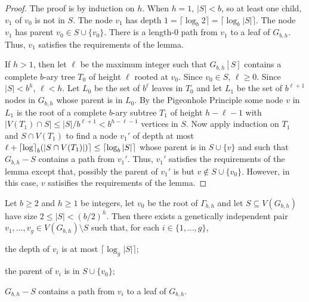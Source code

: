 \documentclass{patmorin}
\begin{document}
\begin{proof}
  The proof is by induction on $h$.  When $h=1$, $|S|< b$, so at least one child, $v_1$ of $v_0$ is not in $S$. The node $v_1$ has depth $1 = \lceil \log_b 2\rceil = \lceil\log_b|S|\rceil$.  The node $v_1$ has parent $v_0\in S\cup\{v_0\}$.  There is a length-$0$ path from $v_1$ to a leaf of $G_{b,h}$. Thus, $v_1$ satisfies the requirements of the lemma.

  If $h>1$, then let $\ell$ be the maximum integer such that $G_{b,h}[S]$ contains a complete $b$-ary tree $T_0$ of height $\ell$ rooted at $v_0$.  Since $v_0\in S$, $\ell\ge 0$.  Since $|S|< b^h$, $\ell < h$. Let $L_0$ be the set of $b^\ell$ leaves in $T_0$ and let $L_1$ be the set of $b^{\ell+1}$ nodes in $G_{b,h}$ whose parent is in $L_0$.  By the Pigeonhole Principle some node $v$ in $L_1$ is the root of a complete $b$-ary subtree $T_1$ of height $h-\ell-1$ with $|V(T_1)\cap S|\le |S|/b^{\ell+1} < b^{h-\ell-1}$ vertices in $S$.  Now apply induction on $T_1$ and $S\cap V(T_1)$ to find a node $v_1'$ of depth at most $\ell+{\lceil \log \rceil}_b(|S\cap V(T_1)|)\rceil \le \lceil\log_b |S|\rceil$ whose parent is in $S\cup\{v\}$ and such that $G_{b,h}-S$ contains a path from $v_1'$.  Thus, $v_1'$ satisfies the requirements of the lemma except that, possibly the parent of $v_1'$ is but $v\not\in S\cup\{v_0\}$.  However, in this case, $v$ satisifies the requirements of the lemma.
\end{proof}




\begin{lem}\label{g_paths}
  Let $b\ge 2$ and $h\ge 1$ be integers, let $v_0$ be the root of $\Gamma_{b,h}$ and let $S\subseteq V(G_{b,h})$ have size $2\le |S|< (b/2)^h$.  Then there exists a genetically independent pair $v_1,\ldots,v_g\in V(G_{b,h})\setminus S$ such that, for each $i\in\{1,\ldots,g\}$, 
  \begin{compactenum}[(i)]
    \item the depth of $v_i$ is at most $\lceil \log_g|S|\rceil$;
    \item the parent of $v_i$ is in $S\cup\{v_0\}$;
    \item $G_{b,h}-S$ contains a path from $v_i$ to a leaf of $G_{b,h}$.
  \end{compactenum} 
\end{lem}
\end{document}
